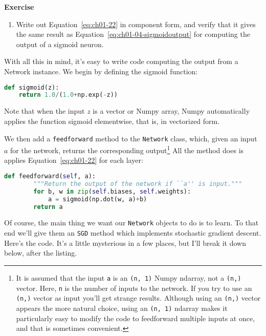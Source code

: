 \textbf{Exercise}
\begin{enumerate}
\item  Write out Equation~\ref{eq:ch01-22} in component form, and verify that it gives the same result as Equation~\ref{eq:ch01-04-sigmoidoutput} for computing the output of a sigmoid neuron.
\end{enumerate} 

With all this in mind, it's easy to write code computing the output from a Network instance. We begin by defining the sigmoid function: 
\begin{lstlisting}[language=Python]
def sigmoid(z):
    return 1.0/(1.0+np.exp(-z))
\end{lstlisting}
Note that when the input $z$ is a vector or Numpy array, Numpy automatically applies the function sigmoid elementwise, that is, in vectorized form.

We then add a \lstinline{feedforward} method to the \lstinline{Network} class, which, given an input $a$ for the network, returns the corresponding output\footnote{It is assumed that the input \lstinline{a} is an \lstinline{(n, 1)} Numpy ndarray, not a \lstinline{(n,)} vector. Here, \lstinline{n} is the number of inputs to the network. If you try to use an \lstinline{(n,)} vector as input you'll get strange results. Although using an \lstinline{(n,)} vector appears the more natural choice, using an \lstinline{(n, 1)} ndarray makes it particularly easy to modify the code to feedforward multiple inputs at once, and that is sometimes convenient. }
All the method does is applies Equation~\ref{eq:ch01-22} for each layer: 
\begin{fullwidth}
\begin{lstlisting}[language=Python]
    def feedforward(self, a):
        """Return the output of the network if ``a'' is input."""
        for b, w in zip(self.biases, self.weights):
            a = sigmoid(np.dot(w, a)+b)
        return a
\end{lstlisting}
\end{fullwidth}
Of course, the main thing we want our \lstinline{Network} objects to do is to learn. To that end we'll give them an \lstinline{SGD} method which implements stochastic gradient descent. Here's the code. It's a little mysterious in a few places, but I'll break it down below, after the listing.

